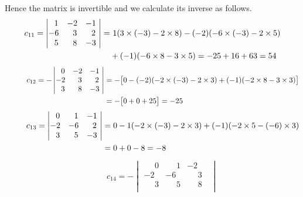 \documentclass[12pt]{amsart}
\begin{document}
\begin{enumerate}
\begin{enumerate}
			Hence the matrix is invertible and we calculate its inverse as follows.
			\begin{align}
			c_{11}=
				\begin{vmatrix}
					\text{ } \text{ }1 &-2 &-1 \text{ } \\
					-6 &\text{ } \text{ }3 &\text{ } \text{ }2 \text{ } \\
					\text{ } \text{ }5 &\text{ } \text{ }8 &-3 \text{ } \\
				\end{vmatrix}=& \text{ } 1(3\times(-3)-2\times8)-(-2)(-6\times(-3)-2\times5) \notag \\
				&+(-1)(-6\times8-3\times5) = -25+16+63=54 \notag
			\end{align}
			\begin{align}
			\hspace{1cm} c_{12}=-
				\begin{vmatrix}
					\text{ } \text{ }0 &-2 &-1 \text{ } \\
					-2 &\text{ } \text{ }3 &\text{ } \text{ }2 \text{ } \\
					\text{ } \text{ }3 &\text{ } \text{ }8 &-3 \text{ } \\
				\end{vmatrix}&=-\big[0-(-2)(-2\times(-3)-2\times3)+(-1)(-2\times8-3\times3)\big] \notag \\
				&=-\big[0+0+25\big]=-25 \notag
			\end{align}
			\begin{align}
			\hspace{0.9cm} c_{13}=
				\begin{vmatrix}
					\text{ } \text{ }0 &\text{ } \text{ }1 &-1 \text{ } \\
					-2 &-6 &\text{ } \text{ }2 \text{ } \\
					\text{ } \text{ }3 &\text{ } \text{ }5 &-3 \text{ } \\
				\end{vmatrix}&=0-1(-2\times(-3)-2\times3)+(-1)(-2\times5-(-6)\times3) \notag \\
				&=0+0-8=-8 \notag
			\end{align}
			\begin{align}
			\hspace{1cm} c_{14}=-
				\begin{vmatrix}
					\text{ } \text{ }0 &\text{ } \text{ }1 &-2 \text{ } \\
					-2 &-6 &\text{ } \text{ }3 \text{ } \\
					\text{ } \text{ }3 &\text{ } \text{ }5 &\text{ } \text{ }8 \text{ } \\

\end{vmatrix}
\end{align}
\end{enumerate}
\end{enumerate}
\end{document}
